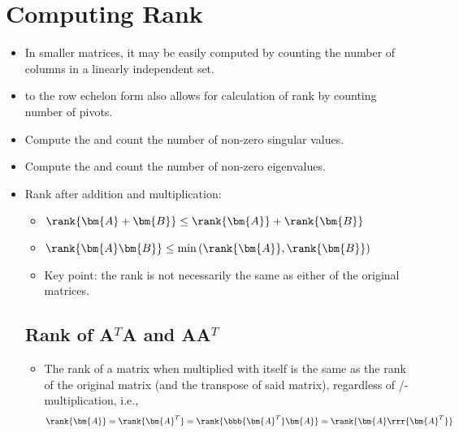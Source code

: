 \section{Computing Rank}\label{Computing Rank}
\begin{itemize}
  \item In smaller matrices, it may be easily computed by counting the number of columns in a linearly independent set.
  \item \hyperref[Row Echelon form]{} to the row echelon form also allows for calculation of rank by counting number of pivots.
  \item Compute the \hyperref[tbd]{} and count the number of non-zero singular values.
  \item Compute the \hyperref[tbd]{} and count the number of non-zero eigenvalues.
  
  \item Rank after addition and multiplication:
  \begin{itemize}
    \item \(\rank{\bm{A}+\bm{B}} \leq \rank{\bm{A}} + \rank{\bm{B}} \)
    \item \(\rank{\bm{A}\bm{B}} \leq \min{(\rank{\bm{A}},\rank{\bm{B}})} \)
    \item Key point: the rank is not necessarily the same as either of the original matrices.
  \end{itemize}
  
  \subsection{Rank of A\texorpdfstring{\(^T\)}{}A and AA\texorpdfstring{\(^T\)}{}}\label{Rank of ATA and AAT}
  \begin{itemize}
    \item The rank of a matrix when multiplied with itself is the same as the rank of the original matrix (and the transpose of said matrix), regardless of /-multiplication, i.e.,
    \[%
    \rank{\bm{A}}  = \rank{\bm{A}^T} = \rank{\bbb{\bm{A}^T}\bm{A}} = \rank{\bm{A}\rrr{\bm{A}^T}}
    \]%
    

\end{itemize}
\end{itemize}
